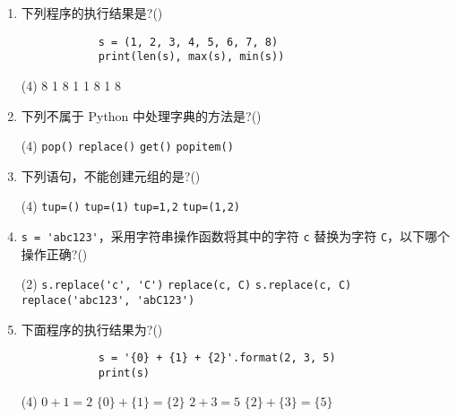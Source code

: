 \documentclass[11pt]{ctexart}
\begin{document}
\begin{enumerate}
        \item 下列程序的执行结果是?(\qquad)
        \begin{lstlisting}
            s = (1, 2, 3, 4, 5, 6, 7, 8)
            print(len(s), max(s), min(s))
        \end{lstlisting}
        \begin{tasks}(4)
             8 1
             8 1
             1 8
             1 8
        \end{tasks}  

        \item 下列不属于 Python 中处理字典的方法是?(\qquad)
        \begin{tasks}(4)
            \task \lstinline{pop()}
            \task \lstinline{replace()}
            \task \lstinline{get()}
            \task \lstinline{popitem()}
        \end{tasks}

        \item 下列语句，不能创建元组的是?(\qquad)
        \begin{tasks}(4)
            \task \lstinline{tup=()}
            \task \lstinline{tup=(1)}
            \task \lstinline{tup=1,2}
            \task \lstinline{tup=(1,2)}
        \end{tasks}  

        \item \lstinline{s = 'abc123'}，采用字符串操作函数将其中的字符 \lstinline{c} 替换为字符 \lstinline{C}，以下哪个操作正确?(\qquad)
        \begin{tasks}(2)
            \task \lstinline{s.replace('c', 'C')}
            \task \lstinline{replace(c, C)}
            \task \lstinline{s.replace(c, C)}
            \task \lstinline{replace('abc123', 'abC123')}
        \end{tasks}

        \item 下面程序的执行结果为?(\qquad)
        \begin{lstlisting}
            s = '{0} + {1} + {2}'.format(2, 3, 5)
            print(s)
        \end{lstlisting}
        \begin{tasks}(4)
            \task $0+1=2$
            \task $\{0\}+\{1\}=\{2\}$
            \task $2+3=5$
            \task $\{2\}+\{3\}=\{5\}$
        \end{tasks}
    \end{enumerate}
\end{document}
